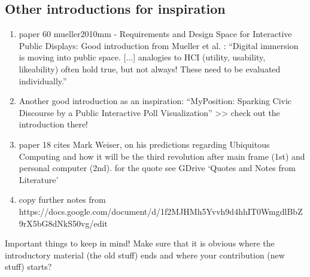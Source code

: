	\subsection{Other introductions for inspiration}
	\begin{enumerate}
	\item paper 60 mueller2010mm - Requirements and Design Space for  Interactive Public Displays: Good introduction from Mueller et al. \cite{muller2010requirements}: ``Digital immersion is moving into public space. [...] analogies to HCI (utility, usability, likeability) often hold true, but not always! These need to be evaluated individually.''

	\item Another good introduction as an inspiration: ``MyPosition: Sparking Civic Discourse by a Public Interactive Poll Visualization'' >> check out the introduction there! \cite{valkanova2014myposition}

	\item paper 18 cites Mark Weiser, on his predictions regarding Ubiquitous Computing and how it will be the third revolution after main frame (1st) and personal computer (2nd). for the quote see GDrive `Quotes and Notes from Literature'

	\item copy further notes from https://docs.google.com/document/d/1f2MJHMh5Yvvh9d4hhIT0WmgdlBbZ9rX5bG8dNkS50vg/edit
	\end{enumerate}

	Important things to keep in mind!
	Make sure that it is obvious where the introductory material (the old stuff) ends and where your contribution (new stuff) starts?

